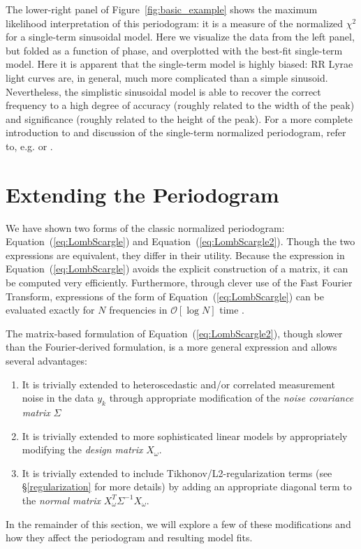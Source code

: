 \documentclass[12pt,preprint]{aastex}
\newcommand{\Fig}[1]{Figure~\ref{fig:#1}}
\newcommand{\fig}[1]{\Fig{#1}}
\newcommand{\Eq}[1]{Equation~(\ref{eq:#1})}
\newcommand{\eq}[1]{\Eq{#1}}
\newcommand{\sectlabel}[1]{\label{sect:#1}}
\begin{document}
The lower-right panel of \fig{basic_example} shows the maximum likelihood interpretation of this periodogram: it is a measure of the normalized $\chi^2$ for a single-term sinusoidal model. Here we visualize the data from the left panel, but folded as a function of phase, and overplotted with the best-fit single-term model. Here it is apparent that the single-term model is highly biased: RR Lyrae light curves are, in general, much more complicated than a simple sinusoid. Nevertheless, the simplistic sinusoidal model is able to recover the correct frequency to a high degree of accuracy (roughly related to the width of the peak) and significance (roughly related to the height of the peak). For a more complete introduction to and discussion of the single-term normalized periodogram, refer to, e.g. \citet{Bretthorst88} or \citet{ICVG2014}.

\section{Extending the Periodogram}
\sectlabel{extending_periodogram}
We have shown two forms of the classic normalized periodogram: \eq{LombScargle} and \eq{LombScargle2}. Though the two expressions are equivalent, they differ in their utility. Because the expression in \eq{LombScargle} avoids the explicit construction of a matrix, it can be computed very efficiently. Furthermore, through clever use of the Fast Fourier Transform, expressions of the form of \eq{LombScargle} can be evaluated exactly for $N$ frequencies in $\mathcal{O}[\log{N}]$ time \citep{Press89}.

The matrix-based formulation of \eq{LombScargle2}, though slower than the Fourier-derived formulation, is a more general expression and allows several advantages:
\begin{enumerate}
  \item It is trivially extended to heteroscedastic and/or correlated measurement noise in the data $y_k$ through appropriate modification of the {\it noise covariance matrix} $\Sigma$
  \item It is trivially extended to more sophisticated linear models by appropriately modifying the {\it design matrix} $X_\omega$.
  \item It is trivially extended to include Tikhonov/L2-regularization terms (see \S \ref{regularization} for more details)  by adding an appropriate diagonal term to the {\it normal matrix} $X_\omega^T\Sigma^{-1}X_\omega$.
\end{enumerate}
In the remainder of this section, we will explore a few of these modifications and how they affect the periodogram and resulting model fits.
\end{document}
